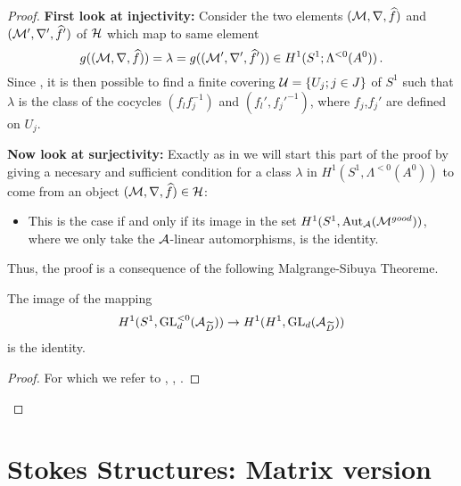 \begin{proof}
  \textbf{First look at injectivity:}
  Consider the two elements $(\mathcal{M},\nabla,\widehat f)$ and $(\mathcal{M}',\nabla',\widehat f')$
  of $\mathcal{H}$ which map to same element
  \[
    g((\mathcal{M},\nabla,\widehat f))=\lambda=g((\mathcal{M}',\nabla',\widehat f'))
      \in H^1(S^1;\Lambda^{<0}(A^0)) \,.
  \]
  Since \TODO{}, it is then possible to find a finite covering
  $\mathcal{U}=\{U_j;j\in J\}$ of $S^1$ such that $\lambda$ is the class of the
  cocycles $(f_lf_j^{-1})$ and $(f_l',f_j'^{-1})$, where $f_j$,$f_j'$ are
  defined on $U_j$.
  \TODO

  \textbf{Now look at surjectivity:}
  Exactly as in \cite{sabbah2007isomonodromic} we will start this part of the
  proof by giving a necesary and sufficient condition for a class $\lambda$ in
  $H^1(S^1,\Lambda^{<0}(A^0))$ to come from an object 
  $(\mathcal{M},\nabla,\widehat f)\in\mathcal{H}$:
  \begin{itemize}
    \item[] This is the case if and only if its image in the set
      $H^1(S^1,\operatorname{Aut}_{\mathcal{A}}(\mathcal{M}^{good}))$, where we only take the $\mathcal{A}$-linear
      automorphisms, is the identity.
  \end{itemize}
  \TODO

  Thus, the proof is a consequence of the following Malgrange-Sibuya Theoreme.
  \begin{thm}
    The image of the mapping
    \[
      H^1(S^1,\operatorname{GL}_d^{<0}(\mathcal{A}_{\widetilde D}))
      \to
      H^1(H^1,\operatorname{GL}_d(\mathcal{A}_{\widetilde D}))
    \] 
    is the identity.
  \end{thm}
  \begin{proof}
     For which we refer to ,
     \cite[Th.6.4.1]{sibuya1990Linear}, \TODO[BV89a, Chap.4].
  \end{proof}
\end{proof}

\section{Stokes Structures: Matrix version}
\begin{comment}
  See
  \begin{itemize}
    \item \cite{Loday1994}
    \item \cite{boalch} and \cite{thboalch}
    \item \cite{babbitt1989local}
  \end{itemize}
\end{comment}

